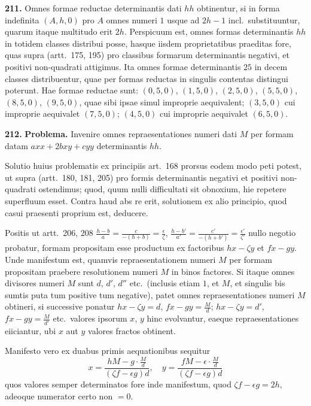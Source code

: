 \documentclass[12pt,a4paper]{article}
\theoremstyle{plain}
\theoremstyle{definition}
\theoremstyle{remark}
\begin{document}
\textbf{211.}
Omnes formae reductae determinantis dati $hh$ obtinentur, si in forma indefinita $(A,h,0)$ pro $A$ omnes numeri $1$ usque ad $2h-1$ incl.\ substituuntur, quarum itaque multitudo erit $2h$. Perspicuum est, omnes formas determinantis $hh$ in totidem classes distribui posse, hasque iisdem proprietatibus praeditas fore, quas supra (artt.\ 175, 195) pro classibus formarum determinantis negativi, et positivi non-quadrati attigimus. Ita omnes formae determinantis $25$ in decem classes distribuentur, quae per formas reductas in singulis contentas distingui poterunt. Hae formae reductae sunt: $(0,5,0)$, $(1,5,0)$, $(2,5,0)$, $(5,5,0)$, $(8,5,0)$, $(9,5,0)$, quae sibi ipsae simul improprie aequivalent; $(3,5,0)$ cui improprie aequivalet $(7,5,0)$; $(4,5,0)$ cui improprie aequivalet $(6,5,0)$.

\textbf{212.}
\textbf{Problema.}
Invenire omnes repraesentationes numeri dati $M$ per formam datam $axx+2bxy+cyy$ determinantis $hh$.

Solutio huius problematis ex principiis art.\ 168 prorsus eodem modo peti potest, ut supra (artt.\ 180, 181, 205) pro formis determinantis negativi et positivi non-quadrati ostendimus; quod, quum nulli difficultati sit obnoxium, hie repetere superfluum esset. Contra haud abs re erit, solutionem ex alio principio, quod casui praesenti proprium est, deducere.

Positis ut artt.\ 206, 208 $\frac{h-b}{a}=\frac{c}{-(h+b)}=\frac{\epsilon}{\zeta}$, $\frac{h-b'}{a'}=\frac{c'}{-(h+b')}=\frac{\epsilon'}{\zeta'}$ nullo negotio probatur, formam propositam esse productum ex factoribus $hx-\zeta y$ et $fx-gy$. Unde manifestum est, quamvis repraesentationem numeri $M$ per formam propositam praebere resolutionem numeri $M$ in binos factores. Si itaque omnes divisores numeri $M$ sunt $d$, $d'$, $d''$ etc.\ (inclusis etiam $1$, et $M$, et singulis bis sumtis puta tum positive tum negative), patet omnes repraesentationes numeri $M$ obtineri, si successive ponatur $hx-\zeta y=d$, $fx-gy=\frac{M}{d}$; $hx-\zeta y=d'$, $fx-gy=\frac{M}{d'}$ etc.\ valores ipsorum $x$, $y$ hinc evolvantur, eaeque repraesentationes eiiciantur, ubi $x$ aut $y$ valores fractos obtinent.

Manifesto vero ex duabus primis aequationibus sequitur
\[
x=\frac{hM-g\cdot\frac{M}{d}}{(\zeta f-\epsilon g)d},\quad y=\frac{fM-\epsilon\cdot\frac{M}{d}}{(\zeta f-\epsilon g)d}
\]
quos valores semper determinatos fore inde manifestum, quod $\zeta f-\epsilon g=2h$, adeoque numerator certo non $=0$.
\end{document}
